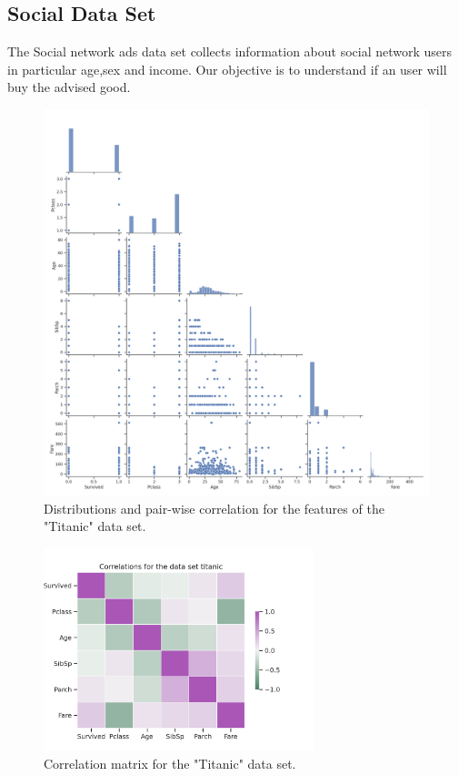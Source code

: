 \documentclass{article}
\begin{document}
\subsection{Social Data Set}
The Social network ads data set \cite{social} collects information about social network users in particular age,sex and income. Our objective is to understand if an user will buy the advised good.

\begin{figure}[h!]
	\centering
	\includegraphics[width=\textwidth]{../plots/titanic_pairplot.png}
	\caption{ Distributions and pair-wise correlation for the features of the "Titanic" data set.}
	\label{pairplot_income}
\end{figure}


\begin{figure}[h!]
	\centering
	\includegraphics[width=0.7\textwidth]{../plots/titanic_correlations.png}
	\caption{Correlation matrix for the "Titanic" data set. }
	\label{correlation_income}
\end{figure}
\end{document}

